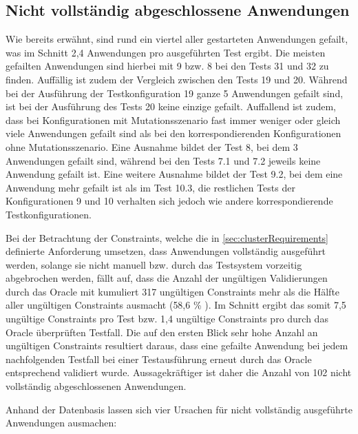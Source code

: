\subsection{Nicht vollständig abgeschlossene Anwendungen}
\label{sec:failedAppsEval}

Wie bereits erwähnt, sind rund ein viertel aller gestarteten Anwendungen gefailt, was im Schnitt 2,4 Anwendungen pro ausgeführten Test ergibt.
Die meisten gefailten Anwendungen sind hierbei mit 9 bzw. 8 bei den Tests 31 und 32 zu finden.
Auffällig ist zudem der Vergleich zwischen den Tests 19 und 20.
Während bei der Ausführung der Testkonfiguration 19 ganze 5 Anwendungen gefailt sind, ist bei der Ausführung des Tests 20 keine einzige gefailt.
Auffallend ist zudem, dass bei Konfigurationen mit Mutationsszenario fast immer weniger oder gleich viele Anwendungen gefailt sind als bei den korrespondierenden Konfigurationen ohne Mutationsszenario.
Eine Ausnahme bildet der Test 8, bei dem 3 Anwendungen gefailt sind, während bei den Tests 7.1 und 7.2 jeweils keine Anwendung gefailt ist.
Eine weitere Ausnahme bildet der Test 9.2, bei dem eine Anwendung mehr gefailt ist als im Test 10.3, die restlichen Tests der Konfigurationen 9 und 10 verhalten sich jedoch wie andere korrespondierende Testkonfigurationen.

Bei der Betrachtung der Constraints, welche die in \autoref{sec:clusterRequirements} definierte Anforderung umsetzen, dass Anwendungen vollständig ausgeführt werden, solange sie nicht manuell bzw. durch das Testsystem vorzeitig abgebrochen werden, fällt auf, dass die Anzahl der ungültigen Validierungen durch das Oracle mit kumuliert 317 ungültigen Constraints mehr als die Hälfte aller ungültigen Constraints ausmacht (58,6 \% ).
Im Schnitt ergibt das somit 7,5 ungültige Constraints pro Test bzw. 1,4 ungültige Constraints pro durch das Oracle überprüften Testfall.
Die auf den ersten Blick sehr hohe Anzahl an ungültigen Constraints resultiert daraus, dass eine gefailte Anwendung bei jedem nachfolgenden Testfall bei einer Testausführung erneut durch das Oracle entsprechend validiert wurde.
Aussagekräftiger ist daher die Anzahl von 102 nicht vollständig abgeschlossenen Anwendungen.

Anhand der Datenbasis lassen sich vier Ursachen für nicht vollständig ausgeführte Anwendungen ausmachen:


